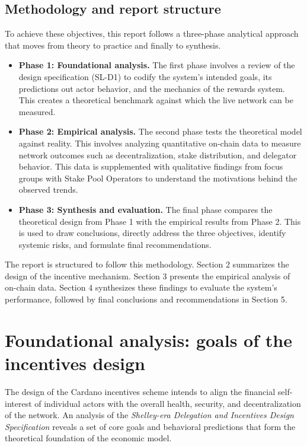 \documentclass[11pt, letterpaper]{article}
\begin{document}
\subsection{Methodology and report structure}
To achieve these objectives, this report follows a three-phase analytical
approach that moves from theory to practice and finally to synthesis.
\begin{itemize}
	\item \textbf{Phase 1: Foundational analysis.} The first phase involves a review of the design
	      specification (SL-D1) to codify the system's intended goals, its predictions out actor behavior, and
	      the mechanics of the rewards system. This creates a theoretical benchmark against which the live
	      network can be measured.
	\item \textbf{Phase 2: Empirical analysis.} The second phase tests the theoretical model against reality.
	      This involves analyzing quantitative on-chain data to measure network outcomes such as decentralization,
	      stake distribution, and delegator behavior. This data is supplemented with qualitative findings from
	      focus groups with Stake Pool Operators to understand the motivations behind the observed trends.
	\item \textbf{Phase 3: Synthesis and evaluation.} The final phase compares the theoretical design from
	      Phase 1 with the empirical results from Phase 2. This is used to draw conclusions, directly address
	      the three objectives, identify systemic risks, and formulate final recommendations.
\end{itemize}
The report is structured to follow this methodology. Section 2 summarizes the design of the incentive
mechanism. Section 3 presents the empirical analysis of on-chain data. Section 4 synthesizes these findings
to evaluate the system's performance, followed by final conclusions and recommendations in Section 5.

\section{Foundational analysis: goals of the incentives design}
The design of the Cardano incentives scheme intends to align the financial
self-interest of individual actors with the overall health, security, and
decentralization of the network. An analysis of the \textit{Shelley-era
	Delegation and Incentives Design Specification} reveals a set of core goals and
behavioral predictions that form the theoretical foundation of the economic
model.
\end{document}
